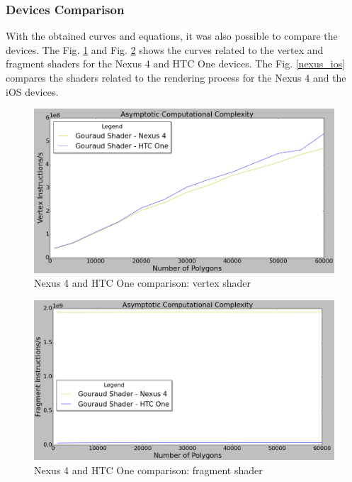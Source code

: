 \documentclass[10pt, conference, compsocconf]{IEEEtran}
\begin{document}
{\subsubsection{Devices Comparison}

With the obtained curves and equations, it was also possible to compare
the devices. The Fig. \ref{nexus_htc_vertex} and Fig. \ref{nexus_htc_fragment} 
shows the curves related to the
vertex and fragment shaders for the Nexus 4 and HTC One devices. The
Fig. \ref{nexus_ios} compares the shaders related to the rendering process
for the Nexus 4 and the iOS devices.

	\begin{figure}[!t]
	\centering
		\includegraphics[keepaspectratio=true,scale=0.27]{figures/vertex_devices_all.png}
	\caption{Nexus 4 and HTC One comparison: vertex shader}
	\label{nexus_htc_vertex}
	\end{figure}
	
	\begin{figure}[!t]
	\centering
		\includegraphics[keepaspectratio=true,scale=0.27]{figures/fragment_devices_all.png}
	\caption{Nexus 4 and HTC One comparison: fragment shader}
	\label{nexus_htc_fragment}
	\end{figure}
	
}
\end{document}
